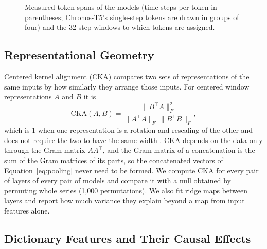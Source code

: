 \documentclass[twoside,11pt]{article}
\begin{document}
\begin{figure}[!tb]
\centering
{}
\caption{Measured token spans of the models (time steps per token in parentheses; Chronos-T5's single-step tokens are drawn in groups of four) and the 32-step windows to which tokens are assigned.}
\label{fig:alignment}
\end{figure}

\subsection{Representational Geometry}
\label{sec:geometry-method}

Centered kernel alignment (CKA) compares two sets of representations of the same inputs by how similarly they arrange those inputs.
For centered window representations $A$ and $B$ it is
\begin{equation}
\mathrm{CKA}(A,B)=\frac{\|B^{\top}A\|_F^2}{\|A^{\top}A\|_F\,\|B^{\top}B\|_F},
\end{equation}
which is 1 when one representation is a rotation and rescaling of the other and does not require the two to have the same width \citep{kornblith2019cka}.
CKA depends on the data only through the Gram matrix $AA^{\top}$, and the Gram matrix of a concatenation is the sum of the Gram matrices of its parts, so the concatenated vectors of Equation~\eqref{eq:pooling} never need to be formed.
We compute CKA for every pair of layers of every pair of models and compare it with a null obtained by permuting whole series (1{,}000 permutations).
We also fit ridge maps between layers \citep{bansal2021stitching} and report how much variance they explain beyond a map from input features alone.

\subsection{Dictionary Features and Their Causal Effects}
\label{sec:causal}
\end{document}
